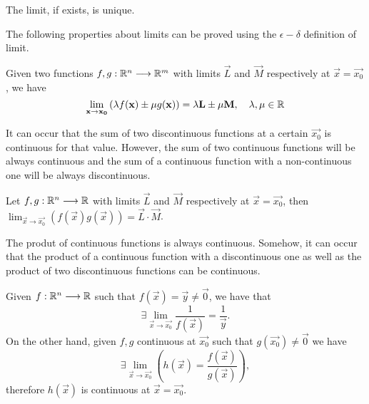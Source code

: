 \begin{prop}
    The limit, if exists, is unique.
\end{prop}

The following properties about limits can be proved using the $\epsilon-\delta$ definition of limit.

\begin{prop}
    Given two functions $\appl{f, g}{\Rtn}{\R^m}$ with limits $\vec{L}$ and $\vec{M}$ respectively at 
    $\vec{x} = \vec{x_0}$, we have
    \begin{equation}
        \lim_{\vec{x}\to\vec{x_0}} \left(\lambda f(\vec{x})\pm \mu g(\vec{x})\right) = \lambda\vec{L}\pm \mu\vec{M},\quad
            \lambda, \mu\in\R
    \end{equation}
\end{prop}

\begin{remark}
    It can occur that the sum of two discontinuous functions at a certain $\vec{x_0}$ is continuous for that value.
    However, the sum of two continuous functions will be always continuous and the sum of a continuous function with a 
    non-continuous one will be always discontinuous.
\end{remark}

\begin{prop}
    Let $\appl{f, g}{\Rtn}{\R}$ with limits $\vec{L}$ and $\vec{M}$ respectively at $\vec{x} = \vec{x_0}$, then
        $\lim_{\vec{x}\to\vec{x_0}}\left(f(\vec{x})g(\vec{x})\right) = \vec{L}\cdot\vec{M}$.
\end{prop}

\begin{remark}
    The produt of continuous functions is always continuous. Somehow, it can occur that the product of a continuous 
    function with a discontinuous one as well as the product of two discontinuous functions can be continuous.
\end{remark}

\begin{prop}
    Given $\appl{f}{\Rtn}{\R}$ such that $f(\vec{x}) = \vec{y}\neq\vec{0}$, we have that
    \begin{equation}
        \exists\lim_{\vec{x}\to\vec{x_0}}\frac{1}{f(\vec{x})} = \frac{1}{\vec{y}}.
    \end{equation}
    On the other hand, given $f, g$ continuous at $\vec{x_0}$ such that $g(\vec{x_0})\neq\vec{0}$ we have
    \begin{equation}
        \exists\lim_{\vec{x}\to\vec{x_0}}\left(h(\vec{x}) = \frac{f(\vec{x})}{g(\vec{x})}\right),
    \end{equation}
    therefore $h(\vec{x})$ is continuous at $\vec{x} = \vec{x_0}$.
\end{prop}

